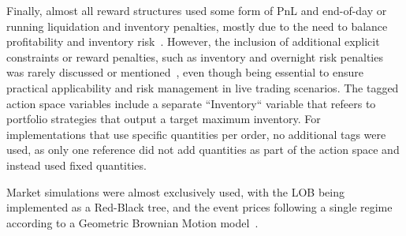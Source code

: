 \begin{figure}[H]
    \centering
    \centering
\end{figure}

Finally, almost all reward structures used some form of PnL and end-of-day or running liquidation and inventory penalties,
mostly due to the need to balance profitability and inventory risk~\cite{Sun2022, Gasperov2021}.
However, the inclusion of additional explicit constraints or reward penalties, such as inventory and overnight risk penalties was rarely discussed or mentioned~\citep{Jerome2022a, Selser2021a, Sun2022},
even though being essential to ensure practical applicability and risk management in live trading scenarios.
The tagged action space variables include a separate ``Inventory`` variable that refeers to portfolio strategies that output a target maximum inventory.
For implementations that use specific quantities per order, no additional tags were used, as only one reference did not add quantities as part of the action space and instead used fixed quantities.

Market simulations were almost exclusively used, with the LOB being implemented as a Red-Black tree,
and the event prices following a single regime according to a Geometric Brownian Motion model~\cite{Gasperov2021, Sun2022}.

